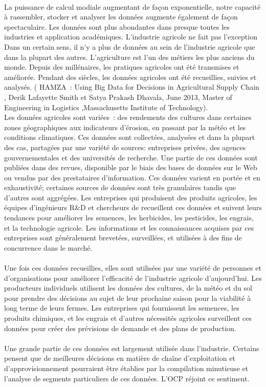 \paragraph{}
La puissance de calcul modiale augmentant de façon exponentielle, notre capacité à rassembler, stocker et analyser les données augmente également de façon spectaculaire. Les données sont plus abondantes dans presque toutes les industries et application académiques. L'industrie agricole ne fait pas l'exception Dans un certain sens, il n'y a plus de données au sein de l'industrie agricole que dans la plupart des autres. L'agriculture est l'un des métiers les plus anciens du monde. Depuis des millénaires, les pratiques agricoles ont été transmises et améliorée. Pendant des siècles, les données agricoles ont été recueillies, suivies et analysés. ( HAMZA : Using Big Data for Decisions in Agricultural Supply Chain , Derik Lafayette Smith et Satya Prakash Dhavala, June 2013, Master of Engineering in Logistics
,Massachusetts Institute of Technology).\\
Les données agricoles sont variées : des rendements des cultures dans certaines zones géographiques aux indicateurs d'érosion, en passant par la météo et les conditions climatiques. Ces données sont collectées, analysées et dans la plupart des cas, partagées par une variété de sources: entreprises privées, des agences gouvernementales et des universités de recherche. Une partie de ces données sont publiées dans des revues, disponible par le biais des bases de données sur le Web ou vendus par des prestataires d'information. Ces données varient en portée et en exhaustivité; certaines sources de données sont très granulaires tandis que d'autres sont aggrégées.
Les entreprises qui produisent des produits agricoles, les équipes d'ingénieurs R&D et chercheurs de recueillent ces données et suivent leurs tendances pour améliorer les semences, les herbicides, les pesticides, les engrais, et la technologie agricole. Les informations et les connaissances acquises par ces entreprises sont généralement brevetées, surveillées, et utilisées à des fins de concurrence dans le marché. 
\paragraph{}
Une fois ces données recueillies, elles sont utilisées par une variété de personnes et d'organisations pour améliorer l'efficacité de l'industrie agricole d'aujourd'hui. Les producteurs individuels utilisent les données des cultures, de la météo et du sol pour prendre des décisions au sujet de leur prochaine saison pour la viabilité à long terme de leurs fermes. Les entreprises qui fournissent les semences, les produits chimiques, et les engrais et d'autres nécessités agricoles surveillent ces données pour créer des prévisions de demande et des plans de production.
\paragraph{} 
Une grande partie de ces données est largement utilisée dans l'industrie. Certains pensent que de meilleures décisions en matière de chaîne d'exploitation et d'approvisionnement pourraient être établies par la compilation minutieuse et l'analyse de segments particuliers de ces données. L'OCP réjoint ce sentiment.